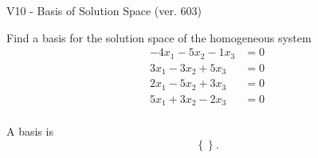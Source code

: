 \begin{exercise}
  \begin{exerciseTitle}V10 - Basis of Solution Space (ver. 603)\end{exerciseTitle}
  \begin{exerciseStatement}
    Find a basis for the solution space of the homogeneous system 
\begin{align*}
 -4 x_ 1 -5 x_ 2 -1 x_ 3 &= 0  \\ 
  3 x_ 1 -3 x_ 2 + 5 x_ 3 &= 0  \\ 
  2 x_ 1 -5 x_ 2 + 3 x_ 3 &= 0  \\ 
  5 x_ 1 + 3 x_ 2 -2 x_ 3 &= 0  \\ 
 \end{align*}


 
  \end{exerciseStatement}

  \begin{exerciseAnswer}
   A basis is   
\[\left\{\right\}.\]

  


  \end{exerciseAnswer}
\end{exercise}